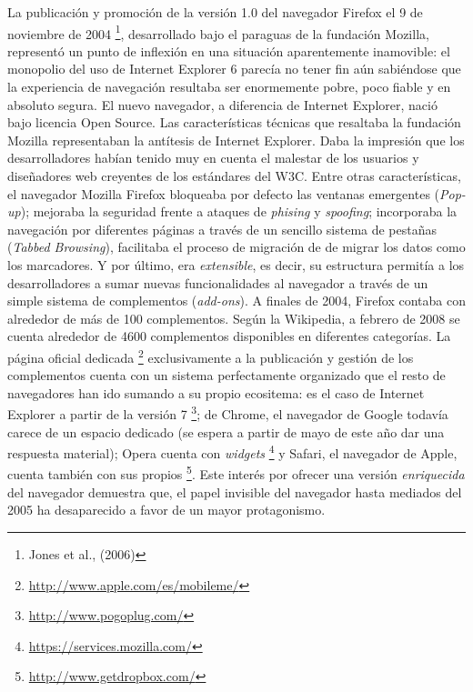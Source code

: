\documentclass[12pt, a4paper,twoside]{book}
\begin{document}
La publicación y promoción de la versión 1.0 del navegador Firefox
el 9 de noviembre de 2004%
\footnote{Jones et al., (2006)},
desarrollado bajo el paraguas de la fundación Mozilla, representó
un punto de inflexión en una situación aparentemente inamovible: el
monopolio del uso de Internet Explorer 6 parecía no tener fin aún
sabiéndose que la experiencia de navegación resultaba ser
enormemente pobre, poco fiable y en absoluto segura. El nuevo
navegador, a diferencia de Internet Explorer, nació bajo licencia
Open Source. Las características técnicas que resaltaba la
fundación Mozilla representaban la antítesis de Internet Explorer.
Daba la impresión que los desarrolladores habían tenido muy en
cuenta el malestar de los usuarios y diseñadores web creyentes de
los estándares del W3C. Entre otras características, el navegador
Mozilla Firefox bloqueaba por defecto las ventanas emergentes
(\emph{Pop-up}); mejoraba la seguridad frente a ataques de
\emph{phising} y \emph{spoofing}; incorporaba la navegación por
diferentes páginas a través de un sencillo sistema de pestañas
(\emph{Tabbed Browsing}), facilitaba el proceso de migración de de
migrar los datos como los marcadores. Y por último, era
\emph{extensible}, es decir, su estructura permitía a los
desarrolladores a sumar nuevas funcionalidades al navegador a
través de un simple sistema de complementos (\emph{add-ons}). A
finales de 2004, Firefox contaba con alrededor de más de 100
complementos. Según la Wikipedia, a febrero de 2008 se cuenta
alrededor de 4600 complementos disponibles en diferentes
categorías. La página oficial dedicada%
\footnote{\href{http://www.apple.com/es/mobileme/}{http://www.apple.com/es/mobileme/}}
exclusivamente a la publicación y gestión de los complementos
cuenta con un sistema perfectamente organizado que el resto de
navegadores han ido sumando a su propio ecositema: es el caso de
Internet Explorer a partir de la versión 7%
\footnote{\href{http://www.pogoplug.com/}{http://www.pogoplug.com/}};
de Chrome, el navegador de Google todavía carece de un espacio
dedicado (se espera a partir de mayo de este año dar una respuesta
material); Opera cuenta con \emph{widgets}%
\footnote{\href{https://services.mozilla.com/}{https://services.mozilla.com/}}
y Safari, el navegador de Apple, cuenta también con sus propios%
\footnote{\href{http://www.getdropbox.com/}{http://www.getdropbox.com/}}.
Este interés por ofrecer una versión \emph{enriquecida} del
navegador demuestra que, el papel invisible del navegador hasta
mediados del 2005 ha desaparecido a favor de un mayor
protagonismo.
\end{document}
